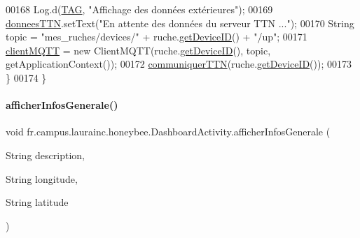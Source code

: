 \begin{DoxyCode}
00168             Log.d(\hyperlink{classfr_1_1campus_1_1laurainc_1_1honeybee_1_1_dashboard_activity_a716b8b0ff7279634ec5d3079ddf5d840}{TAG}, \textcolor{stringliteral}{"Affichage des données extérieures"});
00169             \hyperlink{classfr_1_1campus_1_1laurainc_1_1honeybee_1_1_dashboard_activity_a13c39ae74cce0c7f40b1d67e71d145cb}{donneesTTN}.setText(\textcolor{stringliteral}{"En attente des données du serveur TTN ..."});
00170             String topic = \textcolor{stringliteral}{"mes\_ruches/devices/"} + ruche.\hyperlink{classfr_1_1campus_1_1laurainc_1_1honeybee_1_1_ruche_a0cbf5aacc51f6a0fc5bd9def0f1a32c7}{getDeviceID}() + \textcolor{stringliteral}{"/up"};
00171             \hyperlink{classfr_1_1campus_1_1laurainc_1_1honeybee_1_1_dashboard_activity_ac72bac3feefe69341b1785a0133e1de8}{clientMQTT} = \textcolor{keyword}{new} ClientMQTT(ruche.\hyperlink{classfr_1_1campus_1_1laurainc_1_1honeybee_1_1_ruche_a0cbf5aacc51f6a0fc5bd9def0f1a32c7}{getDeviceID}(), topic, 
      getApplicationContext());
00172             \hyperlink{classfr_1_1campus_1_1laurainc_1_1honeybee_1_1_dashboard_activity_abfefd572745e1034a025bc836812ae4f}{communiquerTTN}(ruche.\hyperlink{classfr_1_1campus_1_1laurainc_1_1honeybee_1_1_ruche_a0cbf5aacc51f6a0fc5bd9def0f1a32c7}{getDeviceID}());
00173         \}
00174     \}
\end{DoxyCode}
\mbox{\label{classfr_1_1campus_1_1laurainc_1_1honeybee_1_1_dashboard_activity_aaa61ed43c60c82f934647f15a38792cd}} 
\paragraph{\texorpdfstring{afficher\+Infos\+Generale()}{afficherInfosGenerale()}}
{\footnotesize\ttfamily void fr.\+campus.\+laurainc.\+honeybee.\+Dashboard\+Activity.\+afficher\+Infos\+Generale (\begin{DoxyParamCaption}\item[{String}]{description,  }\item[{String}]{longitude,  }\item[{String}]{latitude }\end{DoxyParamCaption})\hspace{0.3cm}{\ttfamily [private]}}



